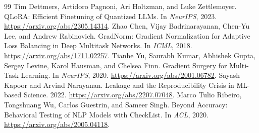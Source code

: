 \begin{thebibliography}{99}
 Tim Dettmers, Artidoro Pagnoni, Ari Holtzman, and Luke Zettlemoyer. QLoRA: Efficient Finetuning of Quantized LLMs. In \emph{NeurIPS}, 2023. \url{https://arxiv.org/abs/2305.14314}.
 Zhao Chen, Vijay Badrinarayanan, Chen-Yu Lee, and Andrew Rabinovich. GradNorm: Gradient Normalization for Adaptive Loss Balancing in Deep Multitask Networks. In \emph{ICML}, 2018. \url{https://arxiv.org/abs/1711.02257}.
 Tianhe Yu, Saurabh Kumar, Abhishek Gupta, Sergey Levine, Karol Hausman, and Chelsea Finn. Gradient Surgery for Multi-Task Learning. In \emph{NeurIPS}, 2020. \url{https://arxiv.org/abs/2001.06782}.
 Sayash Kapoor and Arvind Narayanan. Leakage and the Reproducibility Crisis in ML-based Science. 2022. \url{https://arxiv.org/abs/2207.07048}.
 Marco Tulio Ribeiro, Tongshuang Wu, Carlos Guestrin, and Sameer Singh. Beyond Accuracy: Behavioral Testing of NLP Models with CheckList. In \emph{ACL}, 2020. \url{https://arxiv.org/abs/2005.04118}.
\end{thebibliography}
